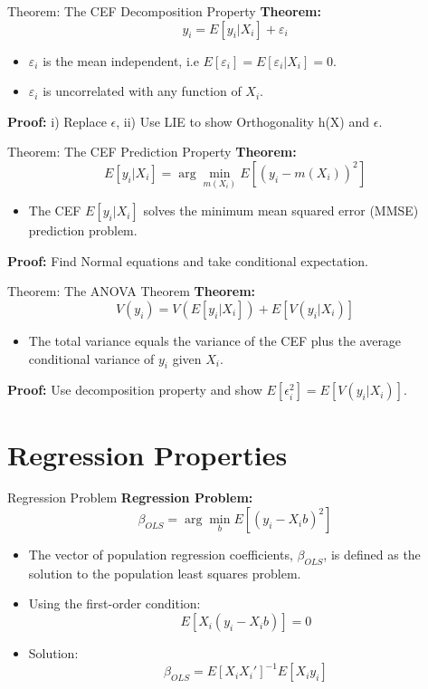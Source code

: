 \documentclass[xcolor=svgnames,t]{beamer}
\begin{document}
\begin{frame}{Theorem: The CEF Decomposition Property}
    \textbf{Theorem:}
    \[
    y_i = E[y_i | X_i] + \varepsilon_i
    \]
    \pause
    \begin{itemize}
        \item \( \varepsilon_i \) is the mean independent, i.e \( E[\varepsilon_i]=E[\varepsilon_i | X_i] = 0 \).
        \pause
        \item \( \varepsilon_i \) is uncorrelated with any function of \( X_i \).
    \end{itemize}
    \vspace{1cm}
    \pause
    \textbf{Proof:} i) Replace $\epsilon$, ii) Use LIE to show Orthogonality h(X) and $\epsilon$.
\end{frame}

\begin{frame}{Theorem: The CEF Prediction Property}
    \textbf{Theorem:}
    \[
    E[y_i | X_i] = \arg \min_{m(X_i)} E[(y_i - m(X_i))^2]
    \]
    \begin{itemize}
        \item The CEF \( E[y_i | X_i] \) solves the minimum mean squared error (MMSE) prediction problem.
    \end{itemize}
    \vspace{1cm}
    \textbf{Proof:} Find Normal equations and take conditional expectation.
\end{frame}

\begin{frame}{Theorem: The ANOVA Theorem}
    \textbf{Theorem:}
    \[
    V(y_i) = V(E[y_i | X_i]) + E[V(y_i | X_i)]
    \]
    \begin{itemize}
        \item The total variance equals the variance of the CEF plus the average conditional variance of \( y_i \) given \( X_i \).
    \end{itemize}
    \vspace{1cm}
    \pause
    \textbf{Proof:} Use decomposition property and show $E[\epsilon^2_i]=E[V(y_i | X_i)]$.
\end{frame}

\section{Regression Properties}
\begin{frame}{Regression Problem}
    \textbf{Regression Problem:}
    \[
    \beta_{OLS} = \arg \min_b E[(y_i - X_i b)^2]
    \]
    \begin{itemize}
        \item The vector of population regression coefficients, \(\beta_{OLS}\), is defined as the solution to the population least squares problem.
        \item Using the first-order condition:
        \[
        E[X_i(y_i - X_i b)] = 0
        \]
        \item Solution:
        \[
        \beta_{OLS} = E[X_i X_i']^{-1} E[X_i y_i]
        \]
    \end{itemize}
\end{frame}
\end{document}
